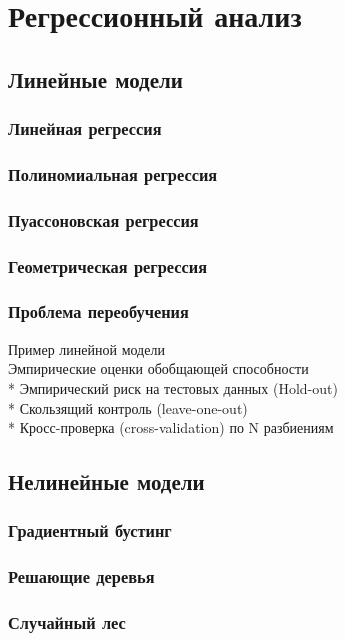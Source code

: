 \section{Регрессионный анализ}


\subsection{Линейные модели}

\subsubsection{Линейная регрессия}

\subsubsection{Полиномиальная регрессия}

\subsubsection{Пуассоновская регрессия}

\subsubsection{Геометрическая регрессия}

\subsubsection{Проблема переобучения}

Пример линейной модели\\

Эмпирические оценки обобщающей способности\\
* Эмпирический риск на тестовых данных (Hold-out)\\
* Скользящий контроль (leave-one-out)\\
* Кросс-проверка (cross-validation) по N разбиениям\\

\subsection{Нелинейные модели}

\subsubsection{Градиентный бустинг}

\subsubsection{Решающие деревья}

\subsubsection{Случайный лес}
